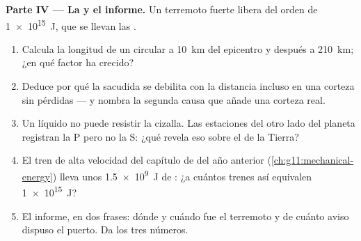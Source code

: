 \begin{problem}
\medskip
\noindent\textbf{Parte IV --- La  y el informe.}
Un terremoto fuerte libera del orden de \qty{1e15}{J}, que se llevan las
.
\begin{enumerate}[resume]
  \item Calcula la longitud de un  circular a \qty{10}{km}
        del epicentro y después a \qty{210}{km}; ¿en qué factor ha
        crecido?
  \item Deduce por qué la sacudida se debilita con la distancia incluso
        en una corteza sin pérdidas --- y nombra la segunda causa que
        añade una corteza real.
  \item Un líquido no puede resistir la cizalla. Las estaciones del otro
        lado del planeta registran la  P pero no la S: ¿qué revela
        eso sobre el  de la Tierra?
  \item El tren de alta velocidad del capítulo de  del año
        anterior (\cref{ch:g11:mechanical-energy}) lleva unos
        \qty{1.5e9}{J} de : ¿a cuántos trenes así
        equivalen \qty{1e15}{J}?
  \item El informe, en dos frases: dónde y cuándo fue el terremoto y de
        cuánto aviso dispuso el puerto. Da los tres números.
\end{enumerate}
\end{problem}
